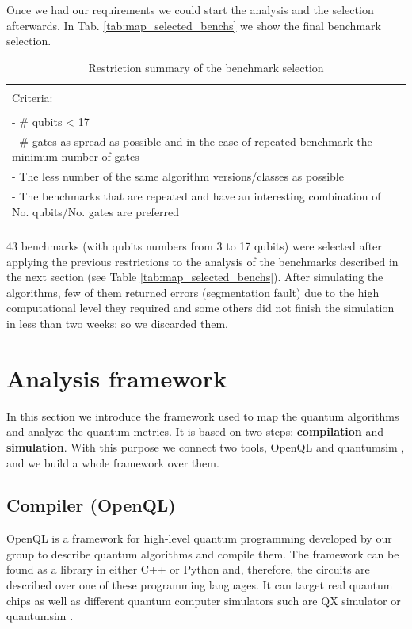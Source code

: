 Once we had our requirements we could start the analysis and the selection afterwards.
In Tab. \ref{tab:map_selected_benchs} we show the final benchmark selection.
\begin{table}[htbp]
\caption{\label{tab:org0f8ca31}
Restriction summary of the benchmark selection}
\centering
\begin{tabular}{|l|}
\hline
\\
Criteria:\\
\\
- \# qubits < 17\\
- \# gates as spread as possible and in the case of repeated benchmark the minimum number of gates\\
- The less number of the same algorithm versions/classes as possible\\
- The benchmarks that are repeated and have an interesting combination of No. qubits/No. gates are  preferred\\
\\
\hline
\end{tabular}
\end{table}
43 benchmarks (with qubits numbers from 3 to 17 qubits) were selected after applying the previous restrictions to the analysis of the benchmarks described in the next section (see Table \ref{tab:map_selected_benchs}).
After simulating the algorithms, few of them returned errors (segmentation fault) due to the high computational level they required and some others did not finish the simulation in less than two weeks; so we discarded them.

\section{Analysis framework}
\label{sec:orgc0c805b}
In this section we introduce the framework used to map the quantum algorithms and analyze the quantum metrics.
It is based on two steps: \textbf{compilation} and \textbf{simulation}.
With this purpose we connect two tools, OpenQL \cite{OpenQL} and quantumsim \cite{O_Brien_2017}, and we build a whole framework over them.

\subsection{Compiler (OpenQL)}
\label{sec:orgeebd0c8}
OpenQL is a framework for high-level quantum programming developed by our group to describe quantum algorithms and compile them.
The framework can be found as a library in either C++ or Python and, therefore, the circuits are described over one of these programming languages. It can target real quantum chips as well as different quantum computer simulators such are QX simulator \cite{Khammassi:2017:QHQ:3130379.3130487} or quantumsim \cite{O_Brien_2017}. 


